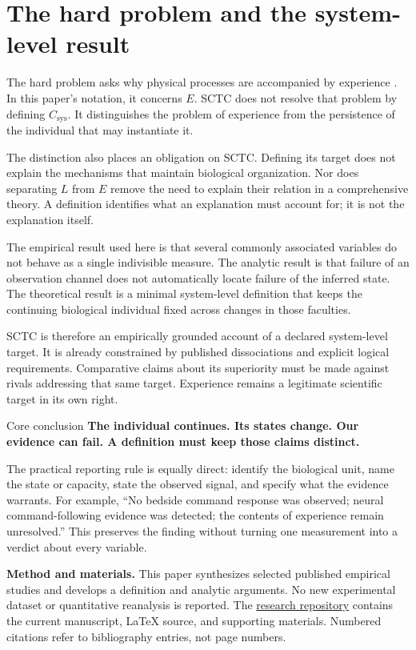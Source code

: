 \documentclass[11pt,letterpaper]{article}
\newcommand{\repoURL}{https://github.com/mikecreation/ZotBot/tree/main/research/not-so-hard-problem-of-consciousness}
\begin{document}
\section{The hard problem and the system-level result}
The hard problem asks why physical processes are accompanied by experience \cite{Chalmers1995}. In this paper's notation, it concerns $E$. SCTC does not resolve that problem by defining $C_{\mathrm{sys}}$. It distinguishes the problem of experience from the persistence of the individual that may instantiate it.

The distinction also places an obligation on SCTC. Defining its target does not explain the mechanisms that maintain biological organization. Nor does separating $L$ from $E$ remove the need to explain their relation in a comprehensive theory. A definition identifies what an explanation must account for; it is not the explanation itself.

The empirical result used here is that several commonly associated variables do not behave as a single indivisible measure. The analytic result is that failure of an observation channel does not automatically locate failure of the inferred state. The theoretical result is a minimal system-level definition that keeps the continuing biological individual fixed across changes in those faculties.

SCTC is therefore an empirically grounded account of a declared system-level target. It is already constrained by published dissociations and explicit logical requirements. Comparative claims about its superiority must be made against rivals addressing that same target. Experience remains a legitimate scientific target in its own right.

\begin{keybox}{Core conclusion}
\textbf{The individual continues. Its states change. Our evidence can fail. A definition must keep those claims distinct.}
\end{keybox}

The practical reporting rule is equally direct: identify the biological unit, name the state or capacity, state the observed signal, and specify what the evidence warrants. For example, ``No bedside command response was observed; neural command-following evidence was detected; the contents of experience remain unresolved.'' This preserves the finding without turning one measurement into a verdict about every variable.

{\small\textbf{Method and materials.} This paper synthesizes selected published empirical studies and develops a definition and analytic arguments. No new experimental dataset or quantitative reanalysis is reported. The \href{\repoURL}{research repository} contains the current manuscript, LaTeX source, and supporting materials. Numbered citations refer to bibliography entries, not page numbers.\par}
\end{document}
